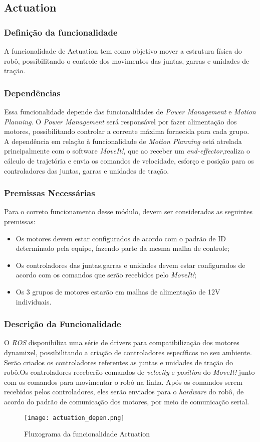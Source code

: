 \subsection{Actuation }
\label{ssec:actu}
\subsubsection{Definição da funcionalidade}
A funcionalidade de Actuation tem como objetivo mover a estrutura física do robô, possibilitando o controle dos movimentos das juntas, garras e unidades de tração.
\subsubsection{Dependências}
Essa funcionalidade depende das funcionalidades de \textit{Power Management} e \textit{Motion Planning}. O \textit{Power Management} será responsável por fazer alimentação dos motores, possibilitando controlar a corrente máxima fornecida para cada grupo.
A dependência em relação à funcionalidade de \textit{Motion Planning} está atrelada principalmente com o software \textit{MoveIt!}, que ao receber um \textit{end-effector},realiza o cálculo de trajetória e envia os comandos de velocidade, esforço e posição para os controladores das juntas, garras e unidades de tração.

\subsubsection{Premissas Necessárias}
Para o correto funcionamento desse módulo, devem ser consideradas as seguintes premissas:
\begin{itemize}
	\item Os motores devem estar configurados de acordo com o padrão de ID determinado pela equipe, fazendo parte da mesma malha de controle;
	\item Os controladores das juntas,garras e unidades devem estar configurados de acordo com os comandos que serão recebidos pelo\textit{ MoveIt!};
	\item Os 3 grupos de motores estarão em malhas de alimentação de 12V individuais.
\end{itemize}
\subsubsection{Descrição da Funcionalidade}
O \textit{ROS} disponibiliza uma série de drivers para compatibilização dos motores dynamixel, possibilitando a criação de controladores específicos no seu ambiente. Serão criados os controladores referentes as juntas e unidades de tração do robô.Os controladores receberão comandos de \textit{velocity} e \textit{position} do \textit{MoveIt!} junto com os comandos para movimentar o robô na linha.
Após os comandos serem recebidos pelos controladores, eles serão enviados para o \textit{hardware} do robô, de acordo do padrão de comunicação dos motores, por meio de comunicação serial. 
\begin{figure}[h]
	\centering
	\texttt{[image: actuation\_depen.png]}
	\caption{Fluxograma da funcionalidade Actuation}
	\label{fig:depen_actuation}
\end{figure}
